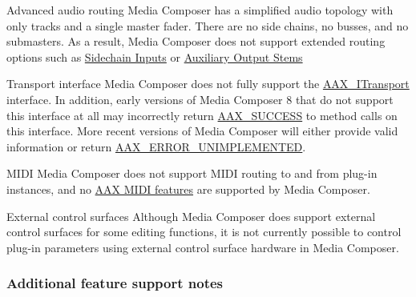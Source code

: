 \begin{DoxyItemize}
\item Advanced audio routing  Media Composer has a simplified audio topology with only tracks and a single master fader. There are no side chains, no busses, and no submasters. As a result, Media Composer does not support extended routing options such as \hyperlink{a00338}{Sidechain Inputs} or \hyperlink{a00339}{Auxiliary Output Stems}  
\item Transport interface  Media Composer does not fully support the \hyperlink{a00116}{A\+A\+X\+\_\+\+I\+Transport} interface. In addition, early versions of Media Composer 8 that do not support this interface at all may incorrectly return \hyperlink{a00207_a5f8c7439f3a706c4f8315a9609811937aeddbd1bb67e3a66e6af54a4b4a7a57b3}{A\+A\+X\+\_\+\+S\+U\+C\+C\+E\+S\+S} to method calls on this interface. More recent versions of Media Composer will either provide valid information or return \hyperlink{a00207_a5f8c7439f3a706c4f8315a9609811937a3b76994b32b97fcd56b19ef8032245df}{A\+A\+X\+\_\+\+E\+R\+R\+O\+R\+\_\+\+U\+N\+I\+M\+P\+L\+E\+M\+E\+N\+T\+E\+D}.  
\item M\+I\+D\+I  Media Composer does not support M\+I\+D\+I routing to and from plug-\/in instances, and no \hyperlink{a00336}{A\+A\+X M\+I\+D\+I features} are supported by Media Composer.  
\item External control surfaces  Although Media Composer does support external control surfaces for some editing functions, it is not currently possible to control plug-\/in parameters using external control surface hardware in Media Composer.  
\end{DoxyItemize}

\hypertarget{a00361_subsection__aax_media_composer_guide__features__additional_notes}{}\subsubsection{Additional feature support notes}\label{a00361_subsection__aax_media_composer_guide__features__additional_notes}
 
